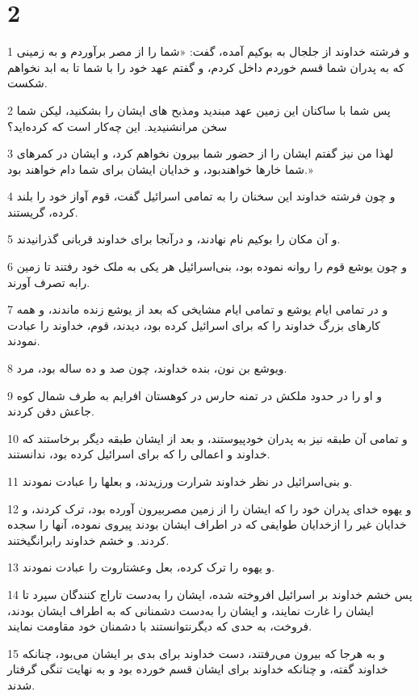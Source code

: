\chapter{2}

\par 1 و فرشته خداوند از جلجال به بوکیم آمده، گفت: «شما را از مصر برآوردم و به زمینی که به پدران شما قسم خوردم داخل کردم، و گفتم عهد خود را با شما تا به ابد نخواهم شکست.
\par 2 پس شما با ساکنان این زمین عهد مبندید ومذبح های ایشان را بشکنید، لیکن شما سخن مرانشنیدید. این چه‌کار است که کرده‌اید؟
\par 3 لهذا من نیز گفتم ایشان را از حضور شما بیرون نخواهم کرد، و ایشان در کمرهای شما خارها خواهندبود، و خدایان ایشان برای شما دام خواهند بود.»
\par 4 و چون فرشته خداوند این سخنان را به تمامی اسرائیل گفت، قوم آواز خود را بلند کرده، گریستند.
\par 5 و آن مکان را بوکیم نام نهادند، و درآنجا برای خداوند قربانی گذرانیدند.
\par 6 و چون یوشع قوم را روانه نموده بود، بنی‌اسرائیل هر یکی به ملک خود رفتند تا زمین رابه تصرف آورند.
\par 7 و در تمامی ایام یوشع و تمامی ایام مشایخی که بعد از یوشع زنده ماندند، و همه کارهای بزرگ خداوند را که برای اسرائیل کرده بود، دیدند، قوم، خداوند را عبادت نمودند.
\par 8 ویوشع بن نون، بنده خداوند، چون صد و ده ساله بود، مرد.
\par 9 و او را در حدود ملکش در تمنه حارس در کوهستان افرایم به طرف شمال کوه جاعش دفن کردند.
\par 10 و تمامی آن طبقه نیز به پدران خودپیوستند، و بعد از ایشان طبقه دیگر برخاستند که خداوند و اعمالی را که برای اسرائیل کرده بود، ندانستند.
\par 11 و بنی‌اسرائیل در نظر خداوند شرارت ورزیدند، و بعلها را عبادت نمودند.
\par 12 و یهوه خدای پدران خود را که ایشان را از زمین مصربیرون آورده بود، ترک کردند، و خدایان غیر را ازخدایان طوایفی که در اطراف ایشان بودند پیروی نموده، آنها را سجده کردند. و خشم خداوند رابرانگیختند.
\par 13 و یهوه را ترک کرده، بعل وعشتاروت را عبادت نمودند.
\par 14 پس خشم خداوند بر اسرائیل افروخته شده، ایشان را به‌دست تاراج کنندگان سپرد تا ایشان را غارت نمایند، و ایشان را به‌دست دشمنانی که به اطراف ایشان بودند، فروخت، به حدی که دیگرنتوانستند با دشمنان خود مقاومت نمایند.
\par 15 و به هرجا که بیرون می‌رفتند، دست خداوند برای بدی بر ایشان می‌بود، چنانکه خداوند گفته، و چنانکه خداوند برای ایشان قسم خورده بود و به نهایت تنگی گرفتار شدند.
